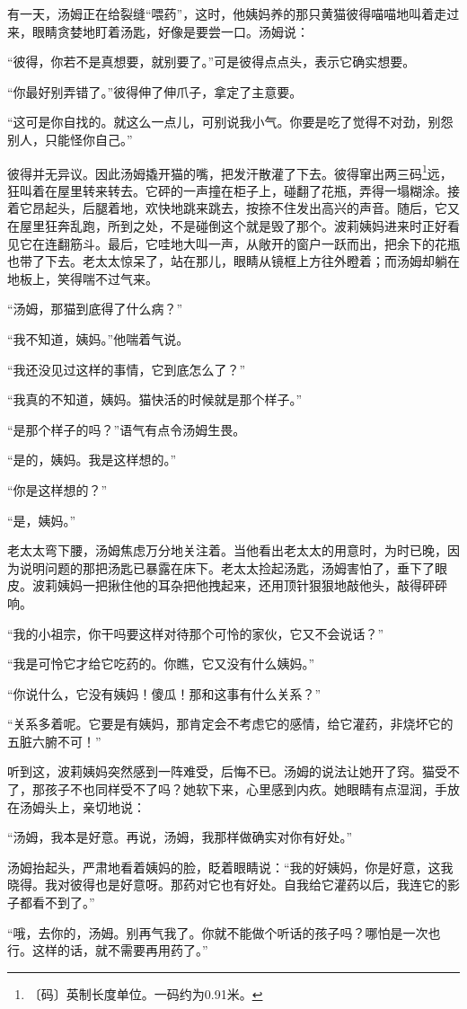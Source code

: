 \documentclass[12pt,UTF-8,openany]{ctexbook}
\begin{document}
\begin{large}
    有一天，汤姆正在给裂缝“喂药”，这时，他姨妈养的那只黄猫彼得喵喵地叫着走过来，眼睛贪婪地盯着汤匙，好像是要尝一口。汤姆说：
    
    “彼得，你若不是真想要，就别要了。”可是彼得点点头，表示它确实想要。
    
    “你最好别弄错了。”彼得伸了伸爪子，拿定了主意要。
    
    “这可是你自找的。就这么一点儿，可别说我小气。你要是吃了觉得不对劲，别怨别人，只能怪你自己。”
    
    彼得并无异议。因此汤姆撬开猫的嘴，把发汗散灌了下去。彼得窜出两三码\footnote{〔码〕英制长度单位。一码约为0.91米。}远，狂叫着在屋里转来转去。它砰的一声撞在柜子上，碰翻了花瓶，弄得一塌糊涂。接着它昂起头，后腿着地，欢快地跳来跳去，按捺不住发出高兴的声音。随后，它又在屋里狂奔乱跑，所到之处，不是碰倒这个就是毁了那个。波莉姨妈进来时正好看见它在连翻筋斗。最后，它哇地大叫一声，从敞开的窗户一跃而出，把余下的花瓶也带了下去。老太太惊呆了，站在那儿，眼睛从镜框上方往外瞪着；而汤姆却躺在地板上，笑得喘不过气来。
    
    “汤姆，那猫到底得了什么病？”
    
    “我不知道，姨妈。”他喘着气说。
    
    “我还没见过这样的事情，它到底怎么了？”
    
    “我真的不知道，姨妈。猫快活的时候就是那个样子。”
    
    “是那个样子的吗？”语气有点令汤姆生畏。
    
    “是的，姨妈。我是这样想的。”
    
    “你是这样想的？”
    
    “是，姨妈。”
    
    老太太弯下腰，汤姆焦虑万分地关注着。当他看出老太太的用意时，为时已晚，因为说明问题的那把汤匙已暴露在床下。老太太捡起汤匙，汤姆害怕了，垂下了眼皮。波莉姨妈一把揪住他的耳杂把他拽起来，还用顶针狠狠地敲他头，敲得砰砰响。
    
    “我的小祖宗，你干吗要这样对待那个可怜的家伙，它又不会说话？”
    
    “我是可怜它才给它吃药的。你瞧，它又没有什么姨妈。”
    
    “你说什么，它没有姨妈！傻瓜！那和这事有什么关系？”
    
    “关系多着呢。它要是有姨妈，那肯定会不考虑它的感情，给它灌药，非烧坏它的五脏六腑不可！”
    
    听到这，波莉姨妈突然感到一阵难受，后悔不已。汤姆的说法让她开了窍。猫受不了，那孩子不也同样受不了吗？她软下来，心里感到内疚。她眼睛有点湿润，手放在汤姆头上，亲切地说：
    
    “汤姆，我本是好意。再说，汤姆，我那样做确实对你有好处。”
    
    汤姆抬起头，严肃地看着姨妈的脸，眨着眼睛说：“我的好姨妈，你是好意，这我晓得。我对彼得也是好意呀。那药对它也有好处。自我给它灌药以后，我连它的影子都看不到了。”
    
    “哦，去你的，汤姆。别再气我了。你就不能做个听话的孩子吗？哪怕是一次也行。这样的话，就不需要再用药了。”
    
\end{large}
\end{document}
